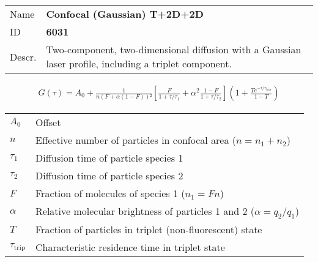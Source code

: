\noindent \begin{tabular}{lp{}}
Name & \textbf{Confocal (Gaussian) T+2D+2D} \\ 
ID & \textbf{6031} \\ 
Descr. &  Two-component, two-dimensional diffusion with a Gaussian laser profile, including a triplet component\cite{Elson1974, Aragon1976, Palmer1987}. \\ 
\end{tabular}
\begin{align}
G(\tau) = A_0 + \frac{1}{n (F + \alpha (1-F))²} \left[ \frac{F}{1+\tau/\tau_1} + \alpha^2 \frac{1-F}{ 1+\tau/\tau_2 } \right] \left(1 + \frac{T e^{-\tau/\tau_\mathrm{trip}}}{1-T}  \right) 
\end{align} 
\begin{center}
\begin{tabular}{ll}
$A_0$ & Offset \\ 
$n$ & Effective number of particles in confocal area ($n = n_1+n_2$) \\ 
$\tau_1$ &  Diffusion time of particle species 1 \\ 
$\tau_2$ &  Diffusion time of particle species 2 \\ 
$F$ & Fraction of molecules of species 1 ($n_1 = F n$) \\
$\alpha$ & Relative molecular brightness of particles 1 and 2 ($ \alpha = q_2/q_1$) \\
$T$ &  Fraction of particles in triplet (non-fluorescent) state\\ 
$\tau_\mathrm{trip}$ &  Characteristic residence time in triplet state \\ 
\end{tabular}
\end{center}
\vspace{2em}



